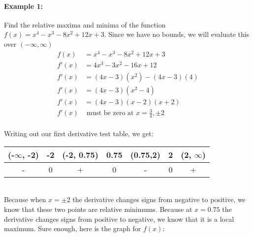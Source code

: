 \documentclass[../revisedmain.tex]{subfiles}
\begin{document}
	\paragraph{Example 1:}Find the relative maxima and minima of the function \\\(f(x)=x^4-x^3-8x^2+12x+3\). Since we have no bounds, we will evaluate this over $(-\infty,\infty)$
	\begin{equation}
		\begin{split}
		f(x)&=x^4-x^3-8x^2+12x+3\\
		f'(x)&=4x^3-3x^2-16x+12\\
		f'(x)&=(4x-3)(x^2)-(4x-3)(4)\\
		f'(x)&=(4x-3)(x^2-4)\\
		f'(x)&=(4x-3)(x-2)(x+2)\\		
		f'(x)&\text{ must be zero at }x=\frac{3}{4},\pm 2\\
		\end{split}
	\end{equation}
	\begin{center}
		Writing out our first derivative test table, we get:\\\vspace{0.25in}
	\begin{tabular}{ |c|c|c|c|c|c|c| } 
		\hline
		(-$\infty$, -2) &-2 & (-2, 0.75) &0.75 &(0.75,2)&2&(2, $\infty$) \\ \hline
		-&0&+&0&-&0&+ \\
		\hline
	\end{tabular}\\\vspace{.25in}
	Because when $x=\pm2$ the derivative changes signs from negative to positive, we know that these two points are relative minimums. Because at $x=0.75$ the derivative changes signs from positive to negative, we know that it is a local maximum. Sure enough, here is the graph for $f(x)$:
	\end{center}
\end{document}
